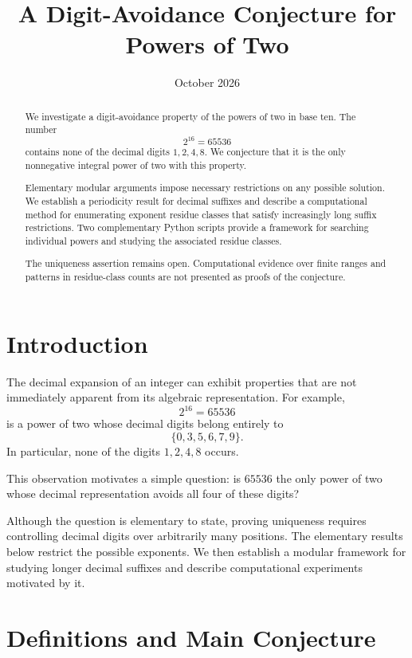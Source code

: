 \documentclass[11pt,a4paper]{article}
\title{A Digit-Avoidance Conjecture for Powers of Two}
\author{}
\date{October 2026}
\theoremstyle{definition}
\theoremstyle{plain}
\theoremstyle{remark}
\begin{document}
\maketitle

\begin{abstract}
We investigate a digit-avoidance property of the powers of two
in base ten. The number
\[
2^{16}=65536
\]
contains none of the decimal digits \(1,2,4,8\). We conjecture
that it is the only nonnegative integral power of two with this
property.

Elementary modular arguments impose necessary restrictions on
any possible solution. We establish a periodicity result for
decimal suffixes and describe a computational method for
enumerating exponent residue classes that satisfy increasingly
long suffix restrictions. Two complementary Python scripts
provide a framework for searching individual powers and studying
the associated residue classes.

The uniqueness assertion remains open. Computational evidence
over finite ranges and patterns in residue-class counts are not
presented as proofs of the conjecture.
\end{abstract}

\section{Introduction}

The decimal expansion of an integer can exhibit properties that
are not immediately apparent from its algebraic representation.
For example,
\[
2^{16}=65536
\]
is a power of two whose decimal digits belong entirely to
\[
\{0,3,5,6,7,9\}.
\]
In particular, none of the digits \(1,2,4,8\) occurs.

This observation motivates a simple question: is \(65536\) the
only power of two whose decimal representation avoids all four
of these digits?

Although the question is elementary to state, proving uniqueness
requires controlling decimal digits over arbitrarily many positions.
The elementary results below restrict the possible exponents.
We then establish a modular framework for studying longer decimal
suffixes and describe computational experiments motivated by it.

\section{Definitions and Main Conjecture}
\end{document}
